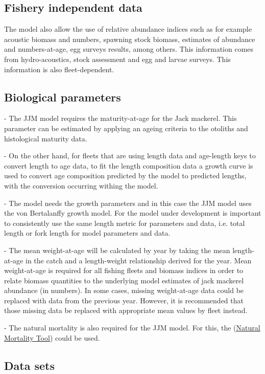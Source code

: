 \documentclass{article}
\begin{document}
\subsection{Fishery independent data}

The model also allow the use of relative abundance indices such as for example acoustic biomass and numbers, spawning stock biomass, estimates of abundance and numbers-at-age, egg surveys results, among others. This information comes from hydro-acoustics, stock assessment and egg and larvae surveys. This information is also fleet-dependent.

\subsection{Biological parameters}

- The JJM model requires the maturity-at-age for the Jack mackerel. This parameter can be estimated by applying an ageing criteria to the otoliths and histological maturity data.

- On the other hand, for fleets that are using length data and age-length keys to convert length to age data, to fit the length composition data a growth curve is used to convert age composition predicted by the model to predicted lengths, with the conversion occurring withing the model.

- The model needs the growth parameters and in this case the JJM model uses the von Bertalanffy growth model. For the model under development is important to consistently use the same length metric for parameters and data, i.e. total length or fork length for model parameters and data.

- The mean weight-at-age will be calculated by year by taking the mean length-at-age in the catch and a length-weight relationship derived for the year. Mean weight-at-age is required for all fishing fleets and biomass indices in order to relate biomass quantities to the underlying model estimates of jack mackerel abundance (in numbers). In some cases, missing weight-at-age data could be replaced with data from the previous year. However, it is recommended that those missing data be replaced with appropriate mean values by fleet instead. 

- The natural mortality is also required for the JJM model. For this, the (\href{https://connect.fisheries.noaa.gov/natural-mortality-tool/}{Natural Mortality Tool}) could be used. 

\subsection{Data sets}
\end{document}
